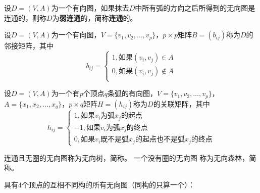 \documentclass{beamer}
\begin{document}
\begin{CJK*}{UTF8}{gbsn}
\begin{frame}
\begin{Def}
   设$D=(V,A)$为一个有向图，如果抹去$D$中所有弧的方向之后所得到的无向图是连通的，则称$D$为{\bfseries 弱连通}的，简称{\bfseries 连通}的。 
  \end{Def}
\end{frame}
\begin{frame}
   \begin{Def}
   设$D=(V,A)$为一个有向图，$V=\{v_1,v_2,\ldots, v_p\}$，$p\times p$矩阵$B=(b_{ij})$称为$D$的邻接矩阵，其中
  \[b_{ij}=\begin{cases}
      1, \text{如果}(v_i,v_j)\in A\\
      0, \text{如果}(v_i,v_j)\notin A\\
    \end{cases}
  \]
 \end{Def}
 \begin{Def}
   设$D=(V,A)$为一个有$p$个顶点$q$条弧的有向图，$V=\{v_1,v_2,\ldots, v_p\}$，$A=\{x_1,x_2,\ldots,x_q\}$，$p\times q$矩阵$H=(h_{ij})$称为$D$的关联矩阵，其中
  \[h_{ij}=\begin{cases}
      1, \text{如果}v_i\text{为弧}x_j\text{的起点}\\
      -1, \text{如果}v_i\text{为弧}x_j\text{的终点}\\
      0, \text{如果}v_i\text{既不是弧}x_j\text{的起点也不是弧}x_j\text{的终点}
    \end{cases}
  \]
 \end{Def}
\end{frame}
\begin{frame}
  \begin{Def}
    连通且无圈的无向图称为无向树，简称{}。 一个没有圈的无向图
    称为无向森林，简称{}。
  \end{Def}
\end{frame}
\begin{frame}
        具有$4$个顶点的互相不同构的所有无向图（同构的只算一个）：


\end{frame}
\end{CJK*}
\end{document}
